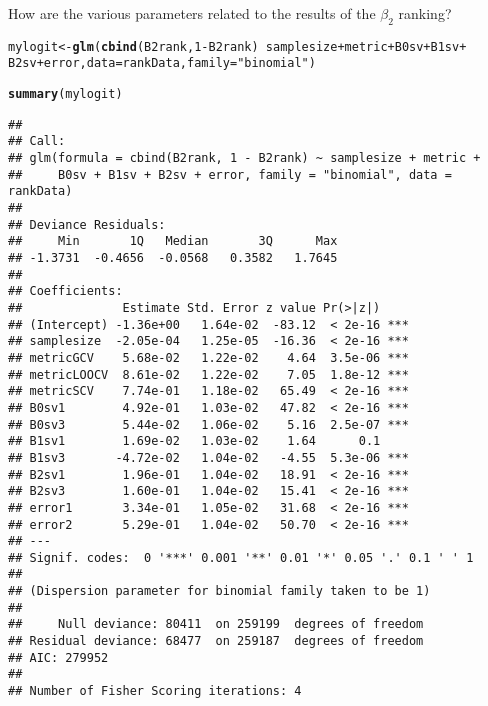 \documentclass{article}\usepackage[]{graphicx}\usepackage[]{color}
\makeatletter
\newcommand{\hlnum}[1]{\textcolor[rgb]{0.686,0.059,0.569}{#1}}%
\newcommand{\hlstr}[1]{\textcolor[rgb]{0.192,0.494,0.8}{#1}}%
\newcommand{\hlopt}[1]{\textcolor[rgb]{0,0,0}{#1}}%
\newcommand{\hlstd}[1]{\textcolor[rgb]{0.345,0.345,0.345}{#1}}%
\newcommand{\hlkwb}[1]{\textcolor[rgb]{0.69,0.353,0.396}{#1}}%
\newcommand{\hlkwc}[1]{\textcolor[rgb]{0.333,0.667,0.333}{#1}}%
\newcommand{\hlkwd}[1]{\textcolor[rgb]{0.737,0.353,0.396}{\textbf{#1}}}%
\newenvironment{kframe}{%
 \def\at@end@of@kframe{}%
 \ifinner\ifhmode%
  \def\at@end@of@kframe{\end{minipage}}%
  \begin{minipage}{\columnwidth}%
 \fi\fi%
 \def\FrameCommand##1{\hskip\@totalleftmargin \hskip-\fboxsep
 \colorbox{shadecolor}{##1}\hskip-\fboxsep
     \hskip-\linewidth \hskip-\@totalleftmargin \hskip\columnwidth}%
 \MakeFramed {\advance\hsize-\width
   \@totalleftmargin\z@ \linewidth\hsize
   \@setminipage}}%
 {\par\unskip\endMakeFramed%
 \at@end@of@kframe}
\newenvironment{knitrout}{}{} %
\makeatother
\begin{document}
How are the various parameters related to the results of the $\beta _2$ ranking?
\begin{knitrout}
\color{fgcolor}\begin{kframe}
\begin{alltt}
\hlstd{mylogit} \hlkwb{<-} \hlkwd{glm}\hlstd{(}\hlkwd{cbind}\hlstd{(B2rank,} \hlnum{1} \hlopt{-} \hlstd{B2rank)} \hlopt{~} \hlstd{samplesize} \hlopt{+} \hlstd{metric} \hlopt{+} \hlstd{B0sv} \hlopt{+} \hlstd{B1sv} \hlopt{+}
    \hlstd{B2sv} \hlopt{+} \hlstd{error,} \hlkwc{data} \hlstd{= rankData,} \hlkwc{family} \hlstd{=} \hlstr{"binomial"}\hlstd{)}
\end{alltt}


{\ttfamily\noindent\color{warningcolor}{\#\# Warning: non-integer counts in a binomial glm!}}\begin{alltt}
\hlkwd{summary}\hlstd{(mylogit)}
\end{alltt}
\begin{verbatim}
## 
## Call:
## glm(formula = cbind(B2rank, 1 - B2rank) ~ samplesize + metric + 
##     B0sv + B1sv + B2sv + error, family = "binomial", data = rankData)
## 
## Deviance Residuals: 
##     Min       1Q   Median       3Q      Max  
## -1.3731  -0.4656  -0.0568   0.3582   1.7645  
## 
## Coefficients:
##              Estimate Std. Error z value Pr(>|z|)    
## (Intercept) -1.36e+00   1.64e-02  -83.12  < 2e-16 ***
## samplesize  -2.05e-04   1.25e-05  -16.36  < 2e-16 ***
## metricGCV    5.68e-02   1.22e-02    4.64  3.5e-06 ***
## metricLOOCV  8.61e-02   1.22e-02    7.05  1.8e-12 ***
## metricSCV    7.74e-01   1.18e-02   65.49  < 2e-16 ***
## B0sv1        4.92e-01   1.03e-02   47.82  < 2e-16 ***
## B0sv3        5.44e-02   1.06e-02    5.16  2.5e-07 ***
## B1sv1        1.69e-02   1.03e-02    1.64      0.1    
## B1sv3       -4.72e-02   1.04e-02   -4.55  5.3e-06 ***
## B2sv1        1.96e-01   1.04e-02   18.91  < 2e-16 ***
## B2sv3        1.60e-01   1.04e-02   15.41  < 2e-16 ***
## error1       3.34e-01   1.05e-02   31.68  < 2e-16 ***
## error2       5.29e-01   1.04e-02   50.70  < 2e-16 ***
## ---
## Signif. codes:  0 '***' 0.001 '**' 0.01 '*' 0.05 '.' 0.1 ' ' 1
## 
## (Dispersion parameter for binomial family taken to be 1)
## 
##     Null deviance: 80411  on 259199  degrees of freedom
## Residual deviance: 68477  on 259187  degrees of freedom
## AIC: 279952
## 
## Number of Fisher Scoring iterations: 4
\end{verbatim}
\end{kframe}
\end{knitrout}
\end{document}
